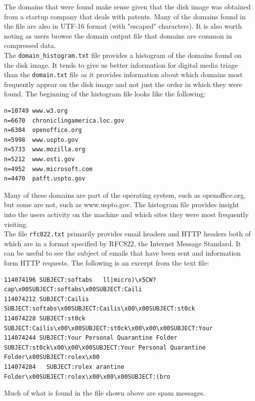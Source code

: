 The domains that were found make sense given that the disk image was obtained from a startup company that deals with patents. Many of the domains found in the file are also in UTF-16 format (with "escaped" characters). It is also worth noting as users browse the domain output file that domains are common in compressed data.\\

The \texttt{domain\_histogram.txt} file provides a histogram of the domains found on the disk image. It tends to give us better information for digital media triage than the \texttt{domain.txt} file as it provides information about which domains most frequently appear on the disk image and not just the order in which they were found. The beginning of the histogram file looks like the following:
\lstset{style=customfile}
\begin{lstlisting}
n=10749	www.w3.org
n=6670	chroniclingamerica.loc.gov
n=6384	openoffice.org
n=5998	www.uspto.gov
n=5733	www.mozilla.org
n=5212	www.osti.gov
n=4952	www.microsoft.com
n=4470	patft.uspto.gov
\end{lstlisting}

Many of these domains are part of the operating system, such as openoffice.org, but some are not, such as www.uspto.gov. The histogram file provides insight into the users activity on the machine and which sites they were most frequently visiting. \\

The file \texttt{rfc822.txt} primarily provides email headers and HTTP headers both of which are in a format specified by RFC822, the Internet Message Standard. It can be useful to see the subject of emails that have been sent and information form HTTP requests. The following is an excerpt from the text file:
\lstset{style=customfile}
\begin{lstlisting}
114074196 SUBJECT:softabs	ll|micro)\x5CW?cap\x00SUBJECT:softabs\x00SUBJECT:Caili
114074212 SUBJECT:Cailis	SUBJECT:softabs\x00SUBJECT:Cailis\x00\x00SUBJECT:st0ck
114074228 SUBJECT:st0ck	SUBJECT:Cailis\x00\x00SUBJECT:st0ck\x00\x00\x00SUBJECT:Your 
114074244 SUBJECT:Your Personal Quarantine Folder
SUBJECT:st0ck\x00\x00\x00SUBJECT:Your Personal Quarantine Folder\x00SUBJECT:rolex\x00
114074284	SUBJECT:rolex arantine Folder\x00SUBJECT:rolex\x00\x00\x00SUBJECT:(bro
\end{lstlisting}
Much of what is found in the file shown above are spam messages.\\

